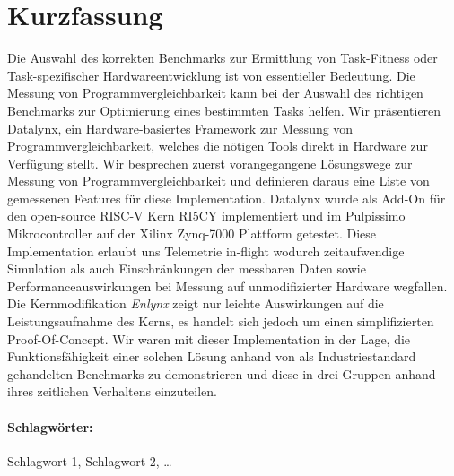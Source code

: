 \documentclass[bachelor_paper.tex]{subfiles}
\begin{document}
\section*{Kurzfassung}\thispagestyle{empty}
    \label{chap:kurzfassung}

    Die Auswahl des korrekten Benchmarks zur Ermittlung von Task-Fitness oder Task-spezifischer Hardwareentwicklung ist von essentieller Bedeutung. Die Messung von Programmvergleichbarkeit kann bei der Auswahl des richtigen Benchmarks zur Optimierung eines bestimmten Tasks helfen. Wir präsentieren Datalynx, ein Hardware-basiertes Framework zur Messung von Programmvergleichbarkeit, welches die nötigen Tools direkt in Hardware zur Verfügung stellt. Wir besprechen zuerst vorangegangene Lösungswege zur Messung von Programmvergleichbarkeit und definieren daraus eine Liste von gemessenen Features für diese Implementation. Datalynx wurde als Add-On für den open-source RISC-V Kern RI5CY implementiert und im Pulpissimo Mikrocontroller auf der Xilinx Zynq-7000 Plattform getestet. Diese Implementation erlaubt uns Telemetrie in-flight wodurch zeitaufwendige Simulation als auch Einschränkungen der messbaren Daten sowie Performanceauswirkungen bei Messung auf unmodifizierter Hardware wegfallen. Die Kernmodifikation \emph{Enlynx} zeigt nur leichte Auswirkungen auf die Leistungsaufnahme des Kerns, es handelt sich jedoch um einen simplifizierten Proof-Of-Concept. Wir waren mit dieser Implementation in der Lage, die Funktionsfähigkeit einer solchen Lösung anhand von als Industriestandard gehandelten Benchmarks zu demonstrieren und diese in drei Gruppen anhand ihres zeitlichen Verhaltens einzuteilen.
    
    \vfill
\paragraph*{Schlagwörter:} Schlagwort 1, Schlagwort 2, \dots
{}

\isstandalone



\fi
\end{document}
